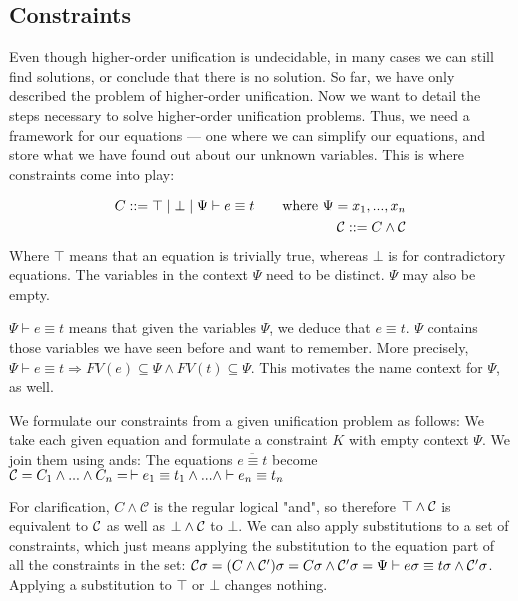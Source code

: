 \documentclass[twoside,12pt,a4paper]{article}
\begin{document}
\subsection{Constraints}

Even though higher-order unification is undecidable, in many cases we can still find solutions,
or conclude that there is no solution.
So far, we have only described the problem of higher-order unification. Now we want to detail the steps necessary to solve higher-order unification problems.
Thus, we need a framework for our equations --- one where we can simplify our equations,
and store what we have found out about our unknown variables. This is where constraints come into play:

\begin{definition}[Constraint]
    \begin{align*}
        C ::= \top \;|\; \bot \;|\; \Psi \vdash e\equiv t \tag*{where $\Psi = x_1, ..., x_n$}\\
        \mathcal{C} ::= C \wedge \mathcal{C}
    \end{align*}
    Where $\top$ means that an equation is trivially true, whereas $\bot$ is for contradictory equations. 
    The variables in the context $\Psi$ need to be distinct. $\Psi$ may also be empty.
\end{definition}
$\Psi \vdash e\equiv t$ means that given the variables $\Psi$, we deduce that $e\equiv t$.
$\Psi$ contains those variables we have seen before and want to remember.
More precisely, $\Psi \vdash e\equiv t \Rightarrow FV(e)\subseteq \Psi \wedge FV(t)\subseteq \Psi$.
This motivates the name context for $\Psi$, as well.

We formulate our constraints from a given unification problem as follows:
We take each given equation and formulate a constraint $K$ with empty context $\Psi$. We join them using ands:
The equations $\overline{e\equiv t}$ become $\mathcal{C} = C_1 \wedge ... \wedge C_n = \, \vdash e_1 \equiv t_1 \wedge ...\wedge \vdash e_n \equiv t_n $  

For clarification, $C \wedge \mathcal{C}$ is the regular logical "and", so therefore 
$\top \wedge \mathcal{C}$ is equivalent to $\mathcal{C}$ as well as $\bot \wedge \mathcal{C}$ to $\bot$.
We can also apply substitutions to a set of constraints, which just means applying the substitution to the equation part of all the constraints in the set:
$\mathcal{C} \sigma = (C \wedge \mathcal{C}')\sigma = C \sigma \wedge \mathcal{C}' \sigma  
= \Psi \vdash e\sigma\equiv t\sigma\wedge \mathcal{C}'\sigma$. Applying a substitution to $\top$ or $\bot$ changes nothing.
\end{document}
